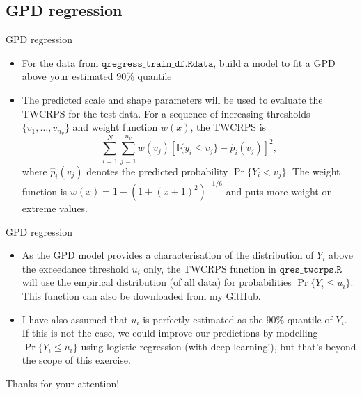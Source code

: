\documentclass{beamer}
\begin{document}
\subsection{GPD regression}
\begin{frame}{GPD regression}
\begin{itemize}
\item For the data from $\texttt{qregress\_train\_df.Rdata}$, build a model to fit a GPD above your estimated $90\%$ quantile
\item The predicted scale and shape parameters will be used to evaluate the TWCRPS for the test data. For a sequence of increasing thresholds $\{v_1,\dots,v_{n_v}\}$ and weight function $w(x)$, the TWCRPS is 
\[
\sum_{i=1}^N\sum^{n_v}_{j=1}w(v_j)[\mathbb{I}\{y_i\leq v_j\}-\hat{p}_i(v_j)]^2,
\]
where $\hat{p}_i(v_j)$ denotes the predicted probability $\Pr\{Y_i < v_j\}$. The weight function is $w(x)=1-(1+(x+1)^2)^{-1/6}$ and puts more weight on extreme values.
\end{itemize}
\end{frame}
\begin{frame}{GPD regression}
\begin{itemize}
\item As the GPD model provides a characterisation of the distribution of $Y_i$ above the exceedance threshold $u_i$ only, the TWCRPS function in $\texttt{qres\_twcrps.R}$ will use the empirical distribution (of all data) for probabilities $\Pr\{Y_i \leq u_i\}$. This function can also be downloaded from my GitHub.
\item I have also assumed that $u_i$ is perfectly estimated as the $90\%$ quantile of $Y_i$. If this is not the case, we could improve our predictions by modelling $\Pr\{Y_i \leq u_i\}$ using logistic regression (with deep learning!), but that's beyond the scope of this exercise. 
\end{itemize}
\end{frame}
\begin{frame}
\begin{center}
\Huge Thanks for your attention!
\end{center}
\end{frame}
\end{document}
